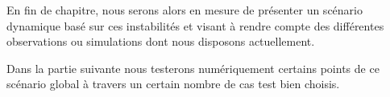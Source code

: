 	En fin de chapitre, nous serons alors en mesure de présenter un scénario dynamique basé sur ces instabilités et visant à rendre compte des
	différentes observations ou simulations dont nous disposons actuellement.

	Dans la partie suivante nous testerons numériquement certains points de ce scénario global à travers un certain nombre de cas test bien
	choisis.

	
	
	

